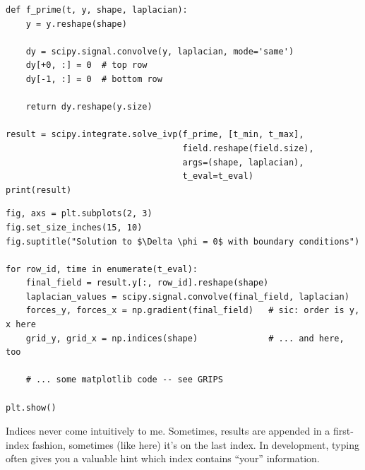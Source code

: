 
\begin{frame}[fragile]
%
\begin{codebox}
\begin{verbatim}
def f_prime(t, y, shape, laplacian):
    y = y.reshape(shape)

    dy = scipy.signal.convolve(y, laplacian, mode='same')
    dy[+0, :] = 0  # top row
    dy[-1, :] = 0  # bottom row

    return dy.reshape(y.size)

result = scipy.integrate.solve_ivp(f_prime, [t_min, t_max],
                                   field.reshape(field.size),
                                   args=(shape, laplacian),
                                   t_eval=t_eval)
print(result)
\end{verbatim}
\end{codebox}
%
\end{frame}


\begin{frame}[fragile]
%
\begin{codebox}
\begin{verbatim}
fig, axs = plt.subplots(2, 3)
fig.set_size_inches(15, 10)
fig.suptitle("Solution to $\Delta \phi = 0$ with boundary conditions")

for row_id, time in enumerate(t_eval):
    final_field = result.y[:, row_id].reshape(shape)
    laplacian_values = scipy.signal.convolve(final_field, laplacian)
    forces_y, forces_x = np.gradient(final_field)   # sic: order is y, x here
    grid_y, grid_x = np.indices(shape)              # ... and here, too

    # ... some matplotlib code -- see GRIPS

plt.show()
\end{verbatim}
\end{codebox}
%
\begin{hintbox}
\footnotesize
Indices never come intuitively to me. Sometimes, results are appended in a first-index fashion, sometimes (like here) it's on the last index.
In development, typing  often gives you a valuable hint which index contains \enquote{your} information.
\end{hintbox}
%
\end{frame}

